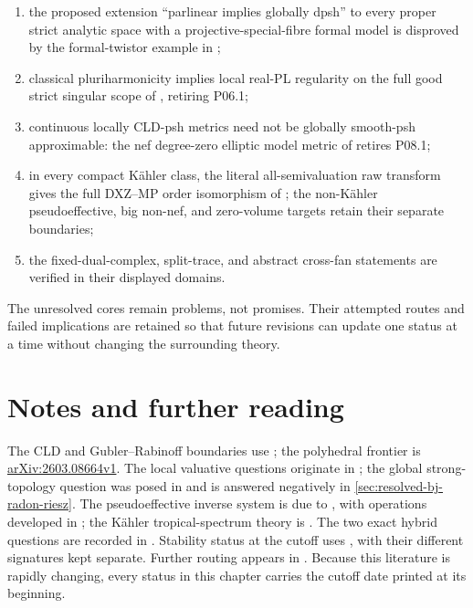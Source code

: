 \begin{enumerate}
      spaces and finite standard-star products at their node tuples have
      first-stage collapse by
      ;
\item the proposed extension ``parlinear implies globally dpsh'' to every
      proper strict analytic space with a projective-special-fibre formal
      model is disproved by the formal-twistor example in
      ;
\item classical pluriharmonicity implies local real-PL regularity on the
      full good strict singular scope of
      , retiring P06.1;
\item continuous locally CLD-psh metrics need not be globally smooth-psh
      approximable: the nef degree-zero elliptic model metric of
       retires P08.1;
\item in every compact K\"ahler class, the literal all-semivaluation raw
      transform gives the full DXZ--MP order isomorphism of
      ; the non-K\"ahler
      pseudoeffective, big non-nef, and zero-volume targets retain their
      separate boundaries;
\item the fixed-dual-complex, split-trace, and abstract cross-fan statements
      are verified in their displayed domains.
\end{enumerate}

The unresolved cores remain problems, not promises.  Their attempted routes
and failed implications are retained so that future revisions can update one
status at a time without changing the surrounding theory.

\section*{Notes and further reading}

The CLD and Gubler--Rabinoff boundaries use
\cite{CLD25,GJR26,GR25PL,GR25Classical,Wanner19,BPR13Structure}; the
polyhedral frontier is
\href{https://arxiv.org/abs/2603.08664}{arXiv:2603.08664v1}.  The local valuative
questions originate in \cite{BFJ08}; the global strong-topology question was
posed in \cite[Question~11.16]{BJ22} and is answered negatively in
\cref{sec:resolved-bj-radon-riesz}.  The pseudoeffective inverse system is due
to
\cite{DXZ23}, with operations developed in \cite{Xia23Operations}; the
Kähler tropical-spectrum theory is \cite{MP24}.  The two exact hybrid questions
are recorded in \cite{PS23Hybrid}.  Stability status at the cutoff uses
\cite{Trusiani26,BJ25WeightedYTD,DarvasZhang25YTD}, with their
different signatures kept separate.  Further routing appears in
.  Because this literature is rapidly
changing, every status in this chapter carries the cutoff date printed at its
beginning.
